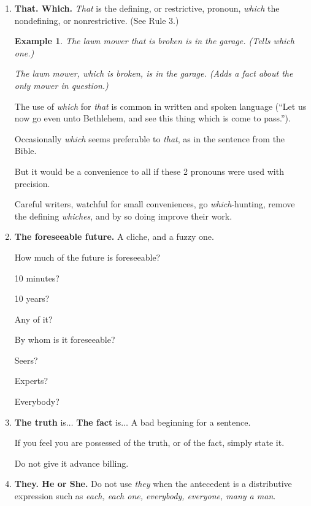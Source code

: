\documentclass{book}
\numberwithin{equation}{section}
\newtheorem{example}{Example}[chapter]
\begin{document}
\begin{enumerate}
    In making your request, write ``Will you please,'' or ``I shall be obliged.''
    
    Then, later, if you feel moved to do so, or if the circumstances call for it, write a letter of acknowledgment.
    \item \textbf{That. Which.} \textit{That} is the defining, or restrictive, pronoun, \textit{which} the nondefining, or nonrestrictive. (See Rule 3.)
    \begin{example}
        The lawn mower that is broken is in the garage. (Tells which one.)
        
        The lawn mower, which is broken, is in the garage. (Adds a fact about the only mower in question.)
    \end{example}
    The use of \textit{which} for \textit{that} is common in written and spoken language (``Let us now go even unto Bethlehem, and see this thing which is come to pass.'').
    
    Occasionally \textit{which} seems preferable to \textit{that}, as in the sentence from the Bible.
    
    But it would be a convenience to all if these 2 pronouns were used with precision.
    
    Careful writers, watchful for small conveniences, go \textit{which}-hunting, remove the defining \textit{whiches}, and by so doing improve their work.
    \item \textbf{The foreseeable future.} A cliche, and a fuzzy one.
    
    How much of the future is foreseeable?
    
    10 minutes?
    
    10 years?
    
    Any of it?
    
    By whom is it foreseeable?
    
    Seers?
    
    Experts?
    
    Everybody?
    \item \textbf{The truth} is$\ldots$ \textbf{The fact} is$\ldots$ A bad beginning for a sentence.

    If you feel you are possessed of the truth, or of the fact, simply state it.
    
    Do not give it advance billing.
    \item \textbf{They. He or She.} Do not use \textit{they} when the antecedent is a distributive expression such as \textit{each, each one, everybody, everyone, many a man}.
    

\end{enumerate}
\end{document}
